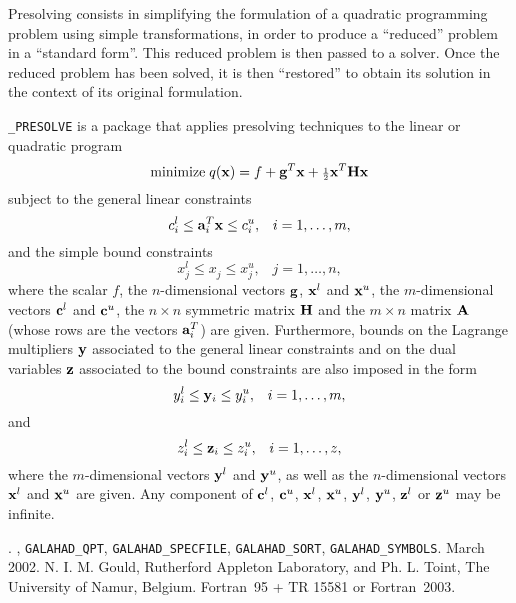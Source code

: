 \documentclass{galahad}
\newcommand{\packagename}{PRESOLVE}
\newcommand{\fullpackagename}{\libraryname\_\packagename}
\begin{document}
\galheader


\galsummary

Presolving consists in simplifying the formulation of a quadratic programming
problem using simple transformations, in order to produce a ``reduced''
problem in a ``standard form''.  This reduced problem is then passed to a
solver.  Once the reduced problem has been solved, it is then ``restored'' to
obtain its solution in the context of its original formulation.

\noindent
{\tt \fullpackagename} is a package that applies presolving techniques to
the linear or quadratic program 
\begin{equation}\label{objqp}
{\rm minimize}\;  q({\mathbf{x}}) = f + {\mathbf{g}}^T {\mathbf{x}} + {\scriptstyle \frac{1}{2}} {\mathbf{x}}^T {\mathbf{H}} {\mathbf{x}}
\end{equation}
subject to the general linear constraints
\begin{equation}\label{gcqp}
c_{i}^{l}  \leq  {\mathbf{a}}_{i}^{T}{\mathbf{x}}  \leq  c_{i}^{u}, \;\;\; i = 1, \ldots , m,
\end{equation}
and the simple bound constraints
\begin{equation}\label{vbqp}
x_{j}^{l}  \leq  x_{j}^{ } \leq  x_{j}^{u} , \;\;\; j = 1, \ldots , n,
\end{equation}
where the scalar $f$, the $n$-dimensional vectors ${\mathbf{g}}$, ${\mathbf{x}}^l$ and
${\mathbf{x}}^u$, the $m$-dimensional vectors ${\mathbf{c}}^l$ and ${\mathbf{c}}^u$,
the $n \times n$ symmetric matrix ${\mathbf{H}}$ and the $m \times n$ matrix ${\mathbf{A}}$
(whose rows are the vectors ${\mathbf{a}}_{i}^T$) are
given. Furthermore, bounds on the Lagrange multipliers ${\mathbf{y}}$ associated to
the general linear constraints and on the dual variables ${\mathbf{z}}$ associated
to the bound constraints are also imposed in the form
\[
y_{i}^{l}  \leq  {\mathbf{y}}_{i}  \leq  y_{i}^{u}, \;\;\;  i = 1, \ldots , m,
\]
and
\[
z_{i}^{l}  \leq  {\mathbf{z}}_{i}  \leq  z_{i}^{u}, \;\;\;  i = 1, \ldots , z,
\]
where the $m$-dimensional vectors ${\mathbf{y}}^l$ and ${\mathbf{y}}^u$, as well as the
$n$-dimensional vectors ${\mathbf{x}}^l$ and ${\mathbf{x}}^u$ are given.
Any component of ${\mathbf{c}}^l$, ${\mathbf{c}}^u$, ${\mathbf{x}}^l$, ${\mathbf{x}}^u$, ${\mathbf{y}}^l$, ${\mathbf{y}}^u$,
${\mathbf{z}}^l$ or ${\mathbf{z}}^u$ may be infinite.


\galattributes
\galversions{\tt  \fullpackagename\_single, \fullpackagename\_double}.
, {\tt GALAHAD\_QPT}, {\tt GALAHAD\_SPECFILE}, 
{\tt GALAHAD\_SORT}, {\tt GALAHAD\_SYMBOLS}.
\galdate March 2002.
\galorigin N. I. M. Gould, Rutherford Appleton Laboratory, and
Ph. L. Toint, The University of Namur, Belgium.
\gallanguage Fortran~95 + TR 15581 or Fortran~2003. 
\end{document}
